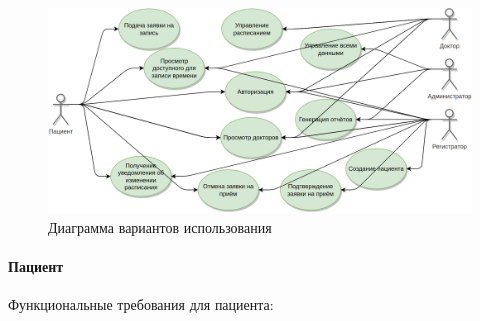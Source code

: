 \documentclass[a4paper,article]{article}
\begin{document}
        \begin{figure}[h]

            \centering

            \includegraphics[width=0.9\linewidth]{Диаграмма вариантов использования.png}

            \caption{\centering Диаграмма вариантов использования}

            \label{fig:Диаграмма вариантов использования}

        \end{figure}

    \paragraph{Пациент}\label{ТЗ. Пациент}

    Функциональные требования для пациента:
\end{document}
